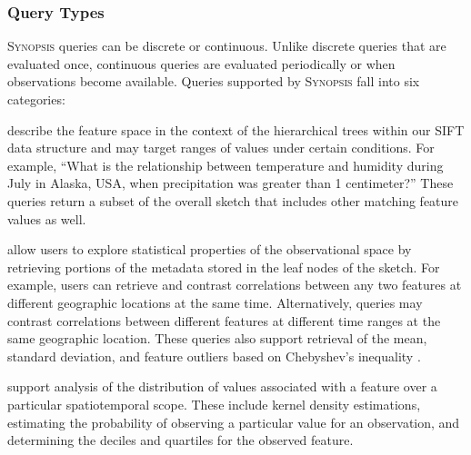 \subsubsection{Query Types}
\textsc{Synopsis} queries can be discrete or continuous. Unlike discrete queries that are evaluated once, continuous queries are evaluated periodically or when observations become available. Queries supported by \textsc{Synopsis} fall into six categories:

\begin{description}[leftmargin=*]
    \item[Relational Queries] describe the feature space in the context of the hierarchical trees within our SIFT data structure and may target ranges of values under certain conditions. For example, ``What is the relationship between temperature and humidity during July in Alaska, USA, when precipitation was greater than 1 centimeter?'' These queries return a subset of the overall sketch that includes other matching feature values as well.

    \item[Statistical Queries] allow users to explore statistical properties of the observational space by retrieving portions of the metadata stored in the leaf nodes of the sketch. For example, users can retrieve and contrast correlations between any two features at different geographic locations at the same time. Alternatively, queries may contrast correlations between different features at different time ranges at the same geographic location. These queries also support retrieval of the mean, standard deviation, and feature outliers based on Chebyshev's inequality \cite{knuth1968art}.

    \item[Density Queries] support analysis of the distribution of values associated with a feature over a particular spatiotemporal scope. These include kernel density estimations, estimating the probability of observing a particular value for an observation, and determining the deciles and quartiles for the observed feature.%


\end{description}
